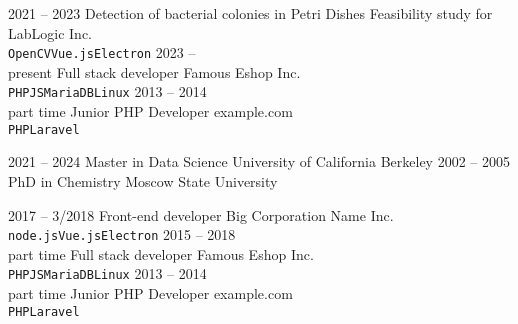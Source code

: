 \documentclass[9pt]{developercv} %
\begin{document}
\begin{entrylist}
	\entry
	{2021 -- 2023}
	{Detection of bacterial colonies in Petri Dishes}
	{Feasibility study for LabLogic Inc.}
	{\lorem \lorem \lorem\\ \texttt{OpenCV}\slashsep\texttt{Vue.js}\slashsep\texttt{Electron}}
	\entry
	{2023 -- \\\footnotesize{present}}
	{Full stack developer}
	{Famous Eshop Inc.}
	{\lorem\lorem\\ \texttt{PHP}\slashsep\texttt{JS}\slashsep\texttt{MariaDB}\slashsep\texttt{Linux}}
	\entry
	{2013 -- 2014\\\footnotesize{part time}}
	{Junior PHP Developer}
	{example.com}
	{\lorem\lorem\\ \texttt{PHP}\slashsep\texttt{Laravel}}
\end{entrylist}



\begin{entrylist}
	\entry
	{2021 -- 2024}
	{Master in Data Science}
	{University of California Berkeley}
	{\lorem\lorem\lorem}
	\entry
	{2002 -- 2005}
	{PhD in Chemistry}
	{Moscow State University}
	{\lorem\lorem}
\end{entrylist}



\begin{entrylist}
	\entry
		{2017 -- 3/2018}
		{Front-end developer}
		{Big Corporation Name Inc.}
		{\lorem \lorem \lorem\\ \texttt{node.js}\slashsep\texttt{Vue.js}\slashsep\texttt{Electron}}
	\entry
		{2015 -- 2018\\\footnotesize{part time}}
		{Full stack developer}
		{Famous Eshop Inc.}
		{\lorem\lorem\\ \texttt{PHP}\slashsep\texttt{JS}\slashsep\texttt{MariaDB}\slashsep\texttt{Linux}}
	\entry
		{2013 -- 2014\\\footnotesize{part time}}
		{Junior PHP Developer}
		{example.com}
		{\lorem\lorem\\ \texttt{PHP}\slashsep\texttt{Laravel}}
\end{entrylist}
\end{document}

